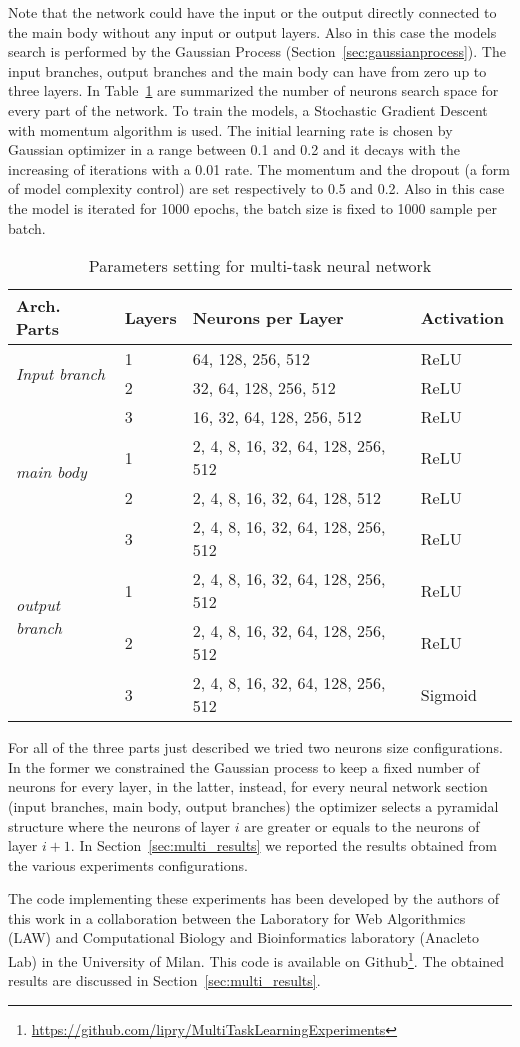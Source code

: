 Note that the network could have the input or the output directly connected to the main body without any input or output layers. 
Also in this case the models search is performed by the Gaussian Process
(Section~\ref{sec:gaussianprocess}). The input branches, output branches and
the main body can have from zero up to three layers. In Table~\ref{tab:mplmtl} are summarized the number of neurons search space for every part of the network. 
To train the models, a Stochastic Gradient Descent with momentum algorithm is used. The initial learning rate is chosen by Gaussian optimizer in a range between 0.1 and 0.2 and it decays with the increasing of iterations with a 0.01 rate. The momentum and the dropout (a form of model complexity control) are set respectively to 0.5 and 0.2. Also in this case the model is iterated for 1000 epochs, the batch size is fixed to 1000 sample per batch. 
\begin{table}[t]
\centering
\begin{tabular}{llll}
\toprule
\textbf{Arch. Parts} & \textbf{Layers} & \textbf{Neurons per Layer} & \textbf{Activation} \\ 
\midrule
\multirow{2}{*}{\textit{Input branch}}  & 1 & 64, 128, 256, 512 & ReLU \\ 
{} & 2 & 32, 64, 128, 256, 512 & ReLU \\
{} & 3 & 16, 32, 64, 128, 256, 512 & ReLU \\
\midrule
\multirow{2}{*}{\textit{main body}} & 1 & 2, 4, 8, 16, 32, 64, 128, 256, 512 & ReLU \\ 
{} & 2 & 2, 4, 8, 16, 32, 64, 128, 512 & ReLU \\
{} & 3 & 2, 4, 8, 16, 32, 64, 128, 256, 512 & ReLU \\
\midrule
\multirow{2}{*}{\textit{output branch}} & 1 & 2, 4, 8, 16, 32, 64, 128, 256, 512 & ReLU\\ 
{} & 2 & 2, 4, 8, 16, 32, 64, 128, 256, 512 & ReLU \\
{} & 3 & 2, 4, 8, 16, 32, 64, 128, 256, 512 & Sigmoid \\
\bottomrule
\end{tabular}
\caption{Parameters setting for multi-task neural network}
\label{tab:mplmtl}
\end{table}
For all of the three parts just described we tried two neurons size configurations. In the former we constrained the Gaussian process to keep a fixed number of neurons for every layer, in the latter, instead, for every neural network section (input branches, main body, output branches) the optimizer selects a pyramidal structure where the neurons of layer $i$ are greater or equals to the neurons of layer $i+1$.
In Section~\ref{sec:multi_results} we reported the results obtained from the various experiments configurations. 

The code implementing these experiments has been developed by the authors of this work in a collaboration between the Laboratory for Web Algorithmics (LAW) and Computational Biology and Bioinformatics laboratory (Anacleto Lab) in the University of Milan. This code is available on Github\footnote{\url{https://github.com/lipry/MultiTaskLearningExperiments}}. The obtained results are discussed in Section~\ref{sec:multi_results}.

